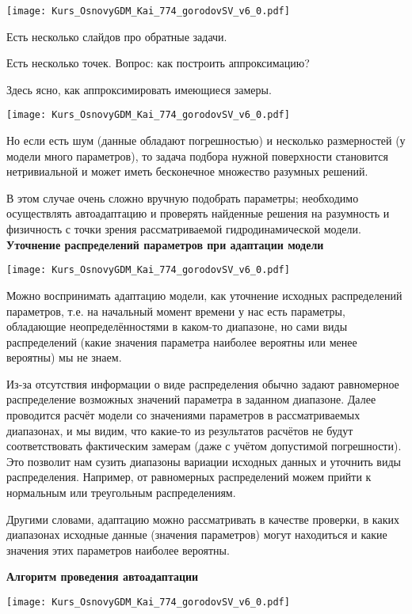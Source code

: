 \texttt{[image: Kurs\_OsnovyGDM\_Kai\_774\_gorodovSV\_v6\_0.pdf]}

Есть несколько слайдов про обратные задачи.

Есть несколько точек. Вопрос: как построить аппроксимацию?

Здесь ясно, как аппроксимировать имеющиеся замеры.

\texttt{[image: Kurs\_OsnovyGDM\_Kai\_774\_gorodovSV\_v6\_0.pdf]}

Но если есть шум (данные обладают погрешностью) и несколько размерностей (у модели много параметров), то задача подбора нужной поверхности становится нетривиальной и может иметь бесконечное множество разумных решений.

В этом случае очень сложно вручную подобрать параметры; необходимо осуществлять автоадаптацию и проверять найденные решения на разумность и физичность с точки зрения рассматриваемой гидродинамической модели.
\\

\textbf{Уточнение распределений параметров при адаптации модели}

\texttt{[image: Kurs\_OsnovyGDM\_Kai\_774\_gorodovSV\_v6\_0.pdf]}

Можно воспринимать адаптацию модели, как уточнение исходных распределений параметров, т.е. на начальный момент времени у нас есть параметры, обладающие неопределённостями в каком-то диапазоне, но сами виды распределений (какие значения параметра наиболее вероятны или менее вероятны) мы не знаем.

Из-за отсутствия информации о виде распределения обычно задают равномерное распределение возможных значений параметра в заданном диапазоне.
Далее проводится расчёт модели со значениями параметров в рассматриваемых диапазонах, и мы видим, что какие-то из результатов расчётов не будут соответствовать фактическим замерам (даже с учётом допустимой погрешности).
Это позволит нам сузить диапазоны вариации исходных данных и уточнить виды распределения.
Например, от равномерных распределений можем прийти к нормальным или треугольным распределениям.

Другими словами, адаптацию можно рассматривать в качестве проверки, в каких диапазонах исходные данные (значения параметров) могут находиться и какие значения этих параметров наиболее вероятны.

\textbf{Алгоритм проведения автоадаптации}

\texttt{[image: Kurs\_OsnovyGDM\_Kai\_774\_gorodovSV\_v6\_0.pdf]}

